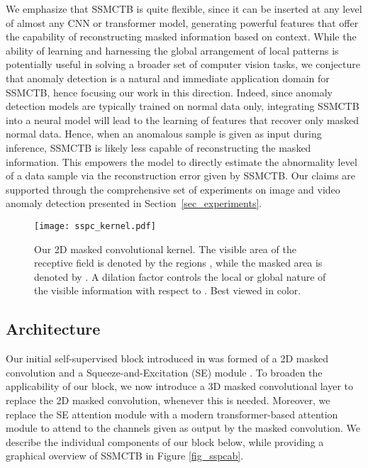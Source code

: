 \documentclass[10pt,journal,compsoc]{IEEEtran}
\begin{document}
We emphasize that SSMCTB is quite flexible, since it can be inserted at any level of almost any CNN or transformer model, generating powerful features that offer the capability of reconstructing masked information based on context. While the ability of learning and harnessing the global arrangement of local patterns is potentially useful in solving a broader set of computer vision tasks, we conjecture that anomaly detection is a natural and immediate application domain for SSMCTB, hence focusing our work in this direction. Indeed, since anomaly detection models are typically trained on normal data only, integrating SSMCTB into a neural model will lead to the learning of features that recover only masked normal data. Hence, when an anomalous sample is given as input during inference, SSMCTB is likely less capable of reconstructing the masked information. This empowers the model to directly estimate the abnormality level of a data sample via the reconstruction error given by SSMCTB. Our claims are supported through the comprehensive set of experiments on image and video anomaly detection presented in Section~\ref{sec_experiments}. 

\begin{figure}[!t]
\begin{center}
\centerline{\texttt{[image: sspc\_kernel.pdf]}}
\vspace{-0.25cm}
\caption{Our 2D masked convolutional kernel. The visible area of the receptive field is denoted by the regions , while the masked area is denoted by . A dilation factor  controls the local or global nature of the visible information with respect to . Best viewed in color.}
\label{fig_kernel}
\end{center}
\end{figure}

\subsection{Architecture}

Our initial self-supervised block introduced in \cite{Ristea-CVPR-2022} was formed of a 2D masked convolution and a Squeeze-and-Excitation (SE) module \cite{Hu-CVPR-2018}. To broaden the applicability of our block, we now introduce a 3D masked convolutional layer to replace the 2D masked convolution, whenever this is needed. Moreover, we replace the SE attention module with a modern transformer-based attention module \cite{Dosovitskiy-ICLR-2020,Vaswani-NIPS-2017} to attend to the channels given as output by the masked convolution. We describe the individual components of our block below, while providing a graphical overview of SSMCTB in Figure \ref{fig_sspcab}.
\end{document}
